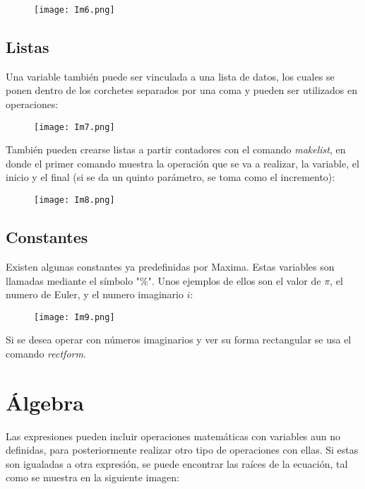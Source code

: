 \documentclass[12pt]{article}
\begin{document}
\begin{figure}[h!]
    \centering
\texttt{[image: Im6.png]}
\end{figure}

\subsection{Listas}
Una variable también puede ser vinculada a una lista de datos, los cuales se ponen dentro de los corchetes separados por una coma y pueden ser utilizados en operaciones:

\begin{figure}[h!]
    \centering
\texttt{[image: Im7.png]}
\end{figure}

\pagebreak

También pueden crearse listas a partir contadores con el comando \textit{makelist}, en donde el primer comando muestra la operación que se va a realizar, la variable, el inicio y el final (si se da un quinto parámetro, se toma como el incremento):

\begin{figure}[h!]
    \centering
\texttt{[image: Im8.png]}
\end{figure}

\subsection{Constantes}
Existen algunas constantes ya predefinidas por Maxima. Estas variables son llamadas mediante el símbolo "\%". Unos ejemplos de ellos son el valor de $\pi$, el numero de Euler, y el numero imaginario $i$: 

\begin{figure}[h!]
    \centering
\texttt{[image: Im9.png]}
\end{figure}

Si se desea operar con números imaginarios y ver su forma rectangular se usa el comando \textit{rectform}.

\section{Álgebra}
Las expresiones pueden incluir operaciones matemáticas con variables aun no definidas, para posteriormente realizar otro tipo de operaciones con ellas. Si estas son igualadas a otra expresión, se puede encontrar las raíces de la ecuación, tal como se muestra en la siguiente imagen:
\end{document}
